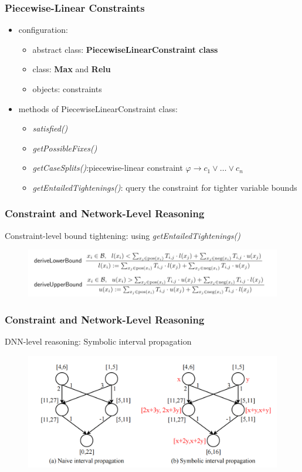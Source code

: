 \documentclass[aspectratio=169%
,serif,mathserif]{beamer}
\begin{document}
\begin{frame}
	\frametitle{Piecewise-Linear Constraints}
		
		\begin{itemize}
			\item configuration:
				\begin{itemize}
					\item abstract class: \textbf{PiecewiseLinearConstraint class}
					\item class: \textbf{Max} and \textbf{Relu}
					\item objects: constraints
				\end{itemize}
			\item methods of PiecewiseLinearConstraint class:
				\begin{itemize}
					\item \emph{satisfied()}
					\item \emph{getPossibleFixes()}
					\item \emph{getCaseSplits()}:piecewise-linear constraint $\varphi \to c_{1} \vee \ldots \vee c_{n}$
					\item \emph{getEntailedTightenings()}: query the constraint for tighter variable bounds
				\end{itemize}
		\end{itemize}
\end{frame}


\begin{frame}
	\frametitle{Constraint and Network-Level Reasoning}
	Constraint-level bound tightening: using \emph{getEntailedTightenings()}
	\begin{figure}[htbp]
		\includegraphics[width=1\linewidth]{3.png}
	\end{figure}
\end{frame}

\begin{frame}
	\frametitle{Constraint and Network-Level Reasoning}
	DNN-level reasoning: Symbolic interval propagation
	\begin{figure}[htbp]
		\includegraphics[width=0.9\linewidth]{2.png}
	\end{figure}
\end{frame}
\end{document}
